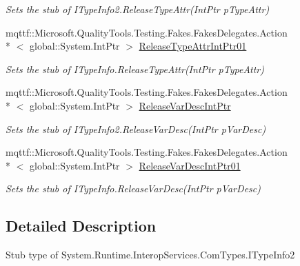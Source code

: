 \begin{DoxyCompactItemize}
\begin{DoxyCompactList}\small\item\em Sets the stub of I\-Type\-Info2.\-Release\-Type\-Attr(\-Int\-Ptr p\-Type\-Attr)\end{DoxyCompactList}\item 
mqttf\-::\-Microsoft.\-Quality\-Tools.\-Testing.\-Fakes.\-Fakes\-Delegates.\-Action\\*
$<$ global\-::\-System.\-Int\-Ptr $>$ \hyperlink{class_system_1_1_runtime_1_1_interop_services_1_1_com_types_1_1_fakes_1_1_stub_i_type_info2_ad1b02c15e725fbcce486c527e305db6a}{Release\-Type\-Attr\-Int\-Ptr01}
\begin{DoxyCompactList}\small\item\em Sets the stub of I\-Type\-Info.\-Release\-Type\-Attr(\-Int\-Ptr p\-Type\-Attr)\end{DoxyCompactList}\item 
mqttf\-::\-Microsoft.\-Quality\-Tools.\-Testing.\-Fakes.\-Fakes\-Delegates.\-Action\\*
$<$ global\-::\-System.\-Int\-Ptr $>$ \hyperlink{class_system_1_1_runtime_1_1_interop_services_1_1_com_types_1_1_fakes_1_1_stub_i_type_info2_a75be579e4ef3a6c2a0ac4fc3764b92a9}{Release\-Var\-Desc\-Int\-Ptr}
\begin{DoxyCompactList}\small\item\em Sets the stub of I\-Type\-Info2.\-Release\-Var\-Desc(\-Int\-Ptr p\-Var\-Desc)\end{DoxyCompactList}\item 
mqttf\-::\-Microsoft.\-Quality\-Tools.\-Testing.\-Fakes.\-Fakes\-Delegates.\-Action\\*
$<$ global\-::\-System.\-Int\-Ptr $>$ \hyperlink{class_system_1_1_runtime_1_1_interop_services_1_1_com_types_1_1_fakes_1_1_stub_i_type_info2_a44cfbb6ffccd0f74fb1a6152d65ae9fa}{Release\-Var\-Desc\-Int\-Ptr01}
\begin{DoxyCompactList}\small\item\em Sets the stub of I\-Type\-Info.\-Release\-Var\-Desc(\-Int\-Ptr p\-Var\-Desc)\end{DoxyCompactList}\end{DoxyCompactItemize}


\subsection{Detailed Description}
Stub type of System.\-Runtime.\-Interop\-Services.\-Com\-Types.\-I\-Type\-Info2



